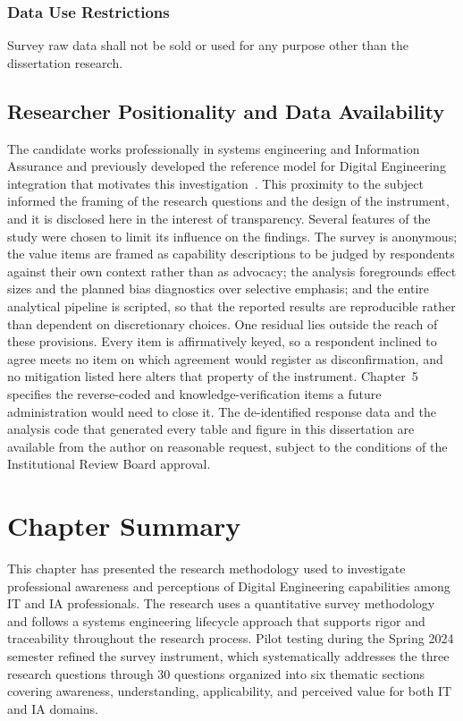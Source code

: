 \subsubsection{Data Use Restrictions} Survey raw data shall not be sold or used for any purpose other than the dissertation research.

\subsection{Researcher Positionality and Data Availability}

The candidate works professionally in systems engineering and Information Assurance and previously developed the reference model for Digital Engineering integration that motivates this investigation~\parencite{Bonar_Hastings_2024}. This proximity to the subject informed the framing of the research questions and the design of the instrument, and it is disclosed here in the interest of transparency. Several features of the study were chosen to limit its influence on the findings. The survey is anonymous; the value items are framed as capability descriptions to be judged by respondents against their own context rather than as advocacy; the analysis foregrounds effect sizes and the planned bias diagnostics over selective emphasis; and the entire analytical pipeline is scripted, so that the reported results are reproducible rather than dependent on discretionary choices. One residual lies outside the reach of these provisions. Every item is affirmatively keyed, so a respondent inclined to agree meets no item on which agreement would register as disconfirmation, and no mitigation listed here alters that property of the instrument. Chapter~5 specifies the reverse-coded and knowledge-verification items a future administration would need to close it. The de-identified response data and the analysis code that generated every table and figure in this dissertation are available from the author on reasonable request, subject to the conditions of the Institutional Review Board approval.

\section{Chapter Summary}

This chapter has presented the research methodology used to investigate professional awareness and perceptions of Digital Engineering capabilities among IT and IA professionals. The research uses a quantitative survey methodology and follows a systems engineering lifecycle approach that supports rigor and traceability throughout the research process. Pilot testing during the Spring 2024 semester refined the survey instrument, which systematically addresses the three research questions through 30 questions organized into six thematic sections covering awareness, understanding, applicability, and perceived value for both IT and IA domains.


